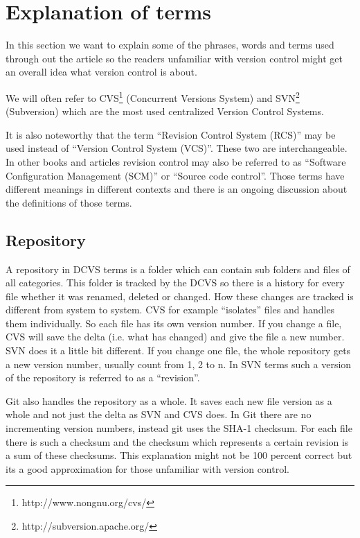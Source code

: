 \section{Explanation of terms}\label{explanationofterms}

In this section we want to explain some of the phrases, words and terms used through out the article so the 
readers unfamiliar with version control might get an overall idea what version control is about.

We will often refer to CVS\footnote{http://www.nongnu.org/cvs/} (Concurrent Versions System) and SVN\footnote{http://subversion.apache.org/} (Subversion) which are the most used centralized Version Control Systems.

It is also noteworthy that the term “Revision Control System (RCS)” may be used instead of “Version Control System (VCS)”. These two are interchangeable. In other books and articles revision control may also be referred to as “Software Configuration Management (SCM)” or “Source code control”. Those terms have different meanings in different contexts and there is an ongoing discussion about the definitions of those terms. \cite[Chapter 1]{hgbook2009}

\subsection{Repository}

A repository in DCVS terms is a folder which can contain sub folders and files of all categories. 
This folder is tracked by the DCVS so there is a history for every file whether it was renamed, deleted or changed. 
How these changes are tracked is different from system to system. CVS for example “isolates” 
files and handles them individually. So each file has its own version number. If you change a file, CVS will 
save the delta (i.e. what has changed) and give the file a new number. SVN does it a little bit 
different. If you change one file, the whole repository gets a new version number, usually count from 1, 2 to n. 
In SVN terms such a version of the repository is referred to as a “revision”.

Git also handles the repository as a whole. It saves each new file version as a whole and not just the delta as SVN and CVS does. 
In Git there are no incrementing version numbers, instead git uses the SHA-1 checksum. For each file there is such a 
checksum and the checksum which represents a certain revision is a sum of these checksums. \cite[Chapter 2.3]{gitpro2009}
This explanation might not be 100 percent correct but its a good approximation for those unfamiliar with version control.


